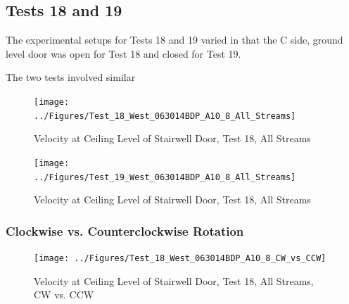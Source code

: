 \documentclass[12pt,oneside]{book}
\begin{document}
%
%
%
%
%
%
\subsection{Tests 18 and 19}
The experimental setups for Tests 18 and 19 varied in that the C side, ground level door was open for Test 18 and closed for Test 19. 

The two tests involved similar 

\begin{figure}[!ht]
\texttt{[image: ../Figures/Test\_18\_West\_063014BDP\_A10\_8\_All\_Streams]}
\caption{Velocity at Ceiling Level of Stairwell Door, Test 18, All Streams}
\label{fig:Test_18_West_063014_SS_BDP_A10}
\end{figure}


\begin{figure}[!ht]
\texttt{[image: ../Figures/Test\_19\_West\_063014BDP\_A10\_8\_All\_Streams]}
\caption{Velocity at Ceiling Level of Stairwell Door, Test 18, All Streams}
\label{fig:Test_18_West_063014_SS_BDP_A10}
\end{figure}

\subsubsection{Clockwise vs. Counterclockwise Rotation}

\begin{figure}[!ht]
\texttt{[image: ../Figures/Test\_18\_West\_063014BDP\_A10\_8\_CW\_vs\_CCW]}
\caption{Velocity at Ceiling Level of Stairwell Door, Test 18, All Streams, CW vs. CCW}
\label{fig:Test_18_West_063014_SS_BDP_A10}
\end{figure}
\end{document}
